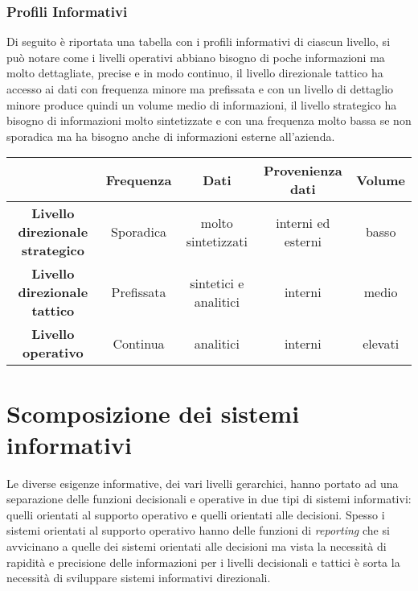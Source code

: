     \subsubsection{Profili Informativi}
        Di seguito è riportata una tabella con i profili informativi di ciascun livello, si può notare come i livelli operativi abbiano bisogno di poche informazioni ma molto dettagliate, precise e in modo continuo, il livello direzionale tattico ha accesso ai dati con frequenza minore ma prefissata e con un livello di dettaglio minore produce quindi un volume medio di informazioni, il livello strategico ha bisogno di informazioni molto sintetizzate e con una frequenza molto bassa se non sporadica ma ha bisogno anche di informazioni esterne all'azienda.
        \begin{table}[H]
            \begin{adjustbox}{width=\textwidth}
                \begin{tabular}{|c|c|c|c|c|}
                    \hline
                    & \textbf{Frequenza} & \textbf{Dati} & \textbf{Provenienza dati} & \textbf{Volume} \\
                    \hline
                    \textbf{Livello direzionale strategico} & Sporadica & molto sintetizzati & interni ed esterni & basso \\
                    \hline
                    \textbf{Livello direzionale tattico} & Prefissata & sintetici e analitici & interni & medio \\
                    \hline
                    \textbf{Livello operativo} & Continua & analitici & interni & elevati \\
                    \hline
                \end{tabular}
            \end{adjustbox}
        \end{table}
\section{Scomposizione dei sistemi informativi}
    Le diverse esigenze informative, dei vari livelli gerarchici, hanno portato ad una separazione delle funzioni decisionali e operative in due tipi di sistemi informativi: quelli orientati al supporto operativo e quelli orientati alle decisioni. Spesso i sistemi orientati al supporto operativo hanno delle funzioni di \textit{reporting} che si avvicinano a quelle dei sistemi orientati alle decisioni ma vista la necessità di rapidità e precisione delle informazioni per i livelli decisionali e tattici è sorta la necessità di sviluppare sistemi informativi direzionali.

